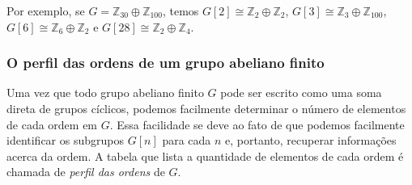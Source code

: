     	\begin{example}
    	Por exemplo, se $G = \mathbb{Z}_{30}\oplus\mathbb{Z}_{100}$, 
    	temos $G[2]\cong \mathbb{Z}_2\oplus\mathbb{Z}_2$, $G[3]\cong \mathbb{Z}_3\oplus\mathbb{Z}_{100}$,
    	$G[6]\cong \mathbb{Z}_6\oplus\mathbb{Z}_2$ e $G[28]\cong \mathbb{Z}_{2}\oplus\mathbb{Z}_4$.
    	\end{example}
    	\subsubsection{O perfil das ordens de um grupo abeliano finito}
    	Uma vez que todo grupo abeliano finito $G$ pode ser escrito como uma soma direta de grupos cíclicos,
    	podemos facilmente determinar o número de elementos de cada ordem em $G$. Essa facilidade se deve ao 
    	fato de que podemos facilmente identificar os subgrupos $G[n]$ para cada $n$ e, portanto, recuperar
    	informações acerca da ordem. A tabela que lista a quantidade de elementos de cada ordem é chamada de
    	\textit{perfil das ordens} de $G$.
    	
